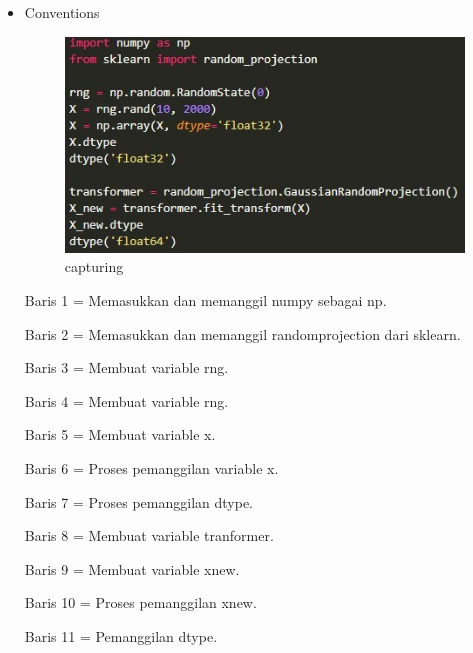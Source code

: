\begin{itemize}
\item Conventions

\begin{figure}[ht]
\centering
\includegraphics[scale=0.5]{figures/Capture7.jpg}
\caption{capturing}
\label{loading an example dataset}
\end{figure}

Baris 1 = Memasukkan dan memanggil numpy sebagai np.

Baris 2 = Memasukkan dan memanggil randomprojection dari sklearn.

Baris 3 = Membuat variable rng.

Baris 4 = Membuat variable rng.

Baris 5 = Membuat variable x.

Baris 6 = Proses pemanggilan variable x.

Baris 7 = Proses pemanggilan dtype.

Baris 8 = Membuat variable tranformer.

Baris 9 = Membuat variable xnew.

Baris 10 = Proses pemanggilan xnew.

Baris 11 = Pemanggilan dtype.

\end{itemize}

